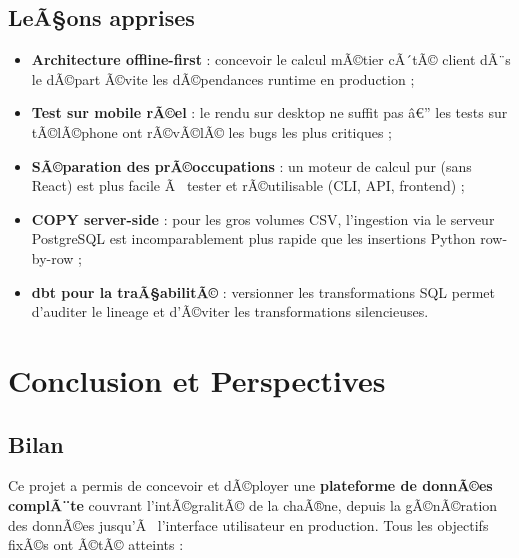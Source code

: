 \documentclass[12pt,a4paper]{report}
\begin{document}
\section{LeÃ§ons apprises}

\begin{itemize}
  \item \textbf{Architecture offline-first} : concevoir le calcul mÃ©tier cÃ´tÃ© client dÃ¨s le dÃ©part Ã©vite les dÃ©pendances runtime en production ;
  \item \textbf{Test sur mobile rÃ©el} : le rendu sur desktop ne suffit pas â€” les tests sur tÃ©lÃ©phone ont rÃ©vÃ©lÃ© les bugs les plus critiques ;
  \item \textbf{SÃ©paration des prÃ©occupations} : un moteur de calcul pur (sans React) est plus facile Ã  tester et rÃ©utilisable (CLI, API, frontend) ;
  \item \textbf{COPY server-side} : pour les gros volumes CSV, l'ingestion via le serveur PostgreSQL est incomparablement plus rapide que les insertions Python row-by-row ;
  \item \textbf{dbt pour la traÃ§abilitÃ©} : versionner les transformations SQL permet d'auditer le lineage et d'Ã©viter les transformations silencieuses.
\end{itemize}

\chapter{Conclusion et Perspectives}
\label{ch:conclusion}

\section{Bilan}

Ce projet a permis de concevoir et dÃ©ployer une \textbf{plateforme de donnÃ©es complÃ¨te} couvrant l'intÃ©gralitÃ© de la chaÃ®ne, depuis la gÃ©nÃ©ration des donnÃ©es jusqu'Ã  l'interface utilisateur en production. Tous les objectifs fixÃ©s ont Ã©tÃ© atteints :
\end{document}
